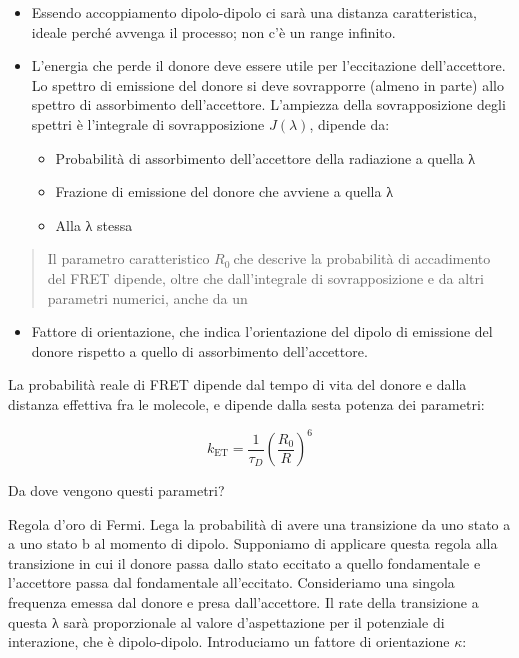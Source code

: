 \begin{itemize}
\item
  Essendo accoppiamento dipolo-dipolo ci sarà una distanza
  caratteristica, ideale perché avvenga il processo; non c'è un range
  infinito.
\item
  L'energia che perde il donore deve essere utile per l'eccitazione
  dell'accettore. Lo spettro di emissione del donore si deve sovrapporre
  (almeno in parte) allo spettro di assorbimento dell'accettore.
  L'ampiezza della sovrapposizione degli spettri è l'integrale di
  sovrapposizione \(J\left( \lambda \right)\), dipende da:

  \begin{itemize}
  \item
    Probabilità di assorbimento dell'accettore della radiazione a quella
    λ
  \item
    Frazione di emissione del donore che avviene a quella λ
  \item
    Alla λ stessa
  \end{itemize}
\end{itemize}

\begin{quote}
Il parametro caratteristico \(R_{0}\ \)che descrive la probabilità di
accadimento del FRET dipende, oltre che dall'integrale di
sovrapposizione e da altri parametri numerici, anche da un
\end{quote}

\begin{itemize}
\item
  Fattore di orientazione, che indica l'orientazione del dipolo di
  emissione del donore rispetto a quello di assorbimento dell'accettore.
\end{itemize}

La probabilità reale di FRET dipende dal tempo di vita del donore e
dalla distanza effettiva fra le molecole, e dipende dalla sesta potenza
dei parametri:

\[k_{\text{ET}} = \frac{1}{\tau_{D}}\left( \frac{R_{0}}{R} \right)^{6}\]

Da dove vengono questi parametri?

Regola d'oro di Fermi. Lega la probabilità di avere una transizione da
uno stato a a uno stato b al momento di dipolo. Supponiamo di applicare
questa regola alla transizione in cui il donore passa dallo stato
eccitato a quello fondamentale e l'accettore passa dal fondamentale
all'eccitato. Consideriamo una singola frequenza emessa dal donore e
presa dall'accettore. Il rate della transizione a questa λ sarà
proporzionale al valore d'aspettazione per il potenziale di interazione,
che è dipolo-dipolo. Introduciamo un fattore di orientazione \(\kappa\):

